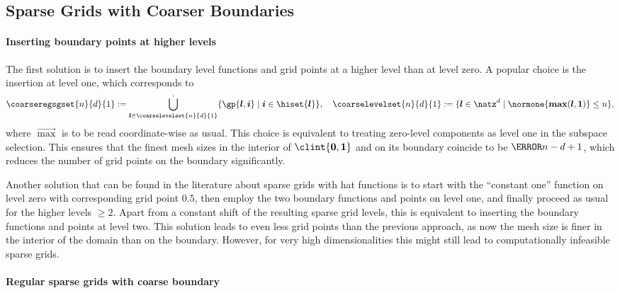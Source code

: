 \subsection{Sparse Grids with Coarser Boundaries}
\label{sec:241coarseBoundary}

\paragraph{Inserting boundary points at higher levels}

The first solution is to insert the boundary level functions and grid points
at a higher level than at level zero.
A popular choice is the insertion at level one, which corresponds to
\begin{equation}
  \label{eq:sparseGridB1}
  \coarseregsgset{n}{d}{1}
  := \bigdotcup_{\*l \in \coarselevelset{n}{d}{1}}
  \{\gp{\*l,\*i} \mid \*i \in \hiset{\*l}\},\quad
  \coarselevelset{n}{d}{1}
  := \{\*l \in \natz^d \mid \normone{\vecmax(\*l, \*1)} \le n\},
\end{equation}
where $\vec{\max}$ is to be read coordinate-wise as usual.
This choice is equivalent to treating zero-level components as level one
in the subspace selection.
This ensures that the finest mesh sizes in the interior of
$\clint{\*0, \*1}$ and on its boundary coincide to be $\ms{n-d+1}$,
which reduces the number of grid points on the boundary significantly.

Another solution that can be found in the literature about sparse grids with
hat functions \cite{Baar15Gradient}
is to start with the ``constant one'' function on level zero with
corresponding grid point $0.5$,
then employ the two boundary functions and points on level one,
and finally proceed as usual for the higher levels $\ge 2$.
Apart from a constant shift of the resulting sparse grid levels,
this is equivalent to inserting the boundary functions and points at level two.
This solution leads to even less grid points than the previous approach,
as now the mesh size is finer in the interior of the domain than on the
boundary.
However, for very high dimensionalities this might still lead to
computationally infeasible sparse grids.

\paragraph{Regular sparse grids with coarse boundary}

